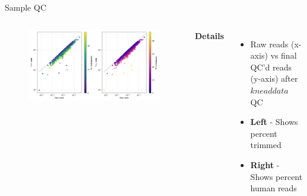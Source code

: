 \begin{frame}{Sample QC}
    \begin{columns}[c] %

    
        \begin{figure}
        \includegraphics[width=1\linewidth]{../figures/kneaddata_counts}
        \end{figure}

    
        \textbf{Details}
        \begin{itemize}
            \item Raw reads (x-axis) vs final QC'd reads (y-axis) after $kneaddata$ QC
            \item \textbf{Left} - Shows percent trimmed
            \item \textbf{Right} - Shows percent human reads
        \end{itemize}

    \end{columns}

\end{frame}


